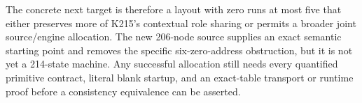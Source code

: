 The concrete next target is therefore a layout with zero runs at most five
that either preserves more of K215's contextual role sharing or permits a
broader joint source/engine allocation.  The new 206-node source supplies
an exact semantic starting point and removes the specific six-zero-address
obstruction, but it is not yet a 214-state machine.  Any successful allocation
still needs every quantified primitive contract, literal blank startup, and
an exact-table transport or runtime proof before a consistency equivalence
can be asserted.
